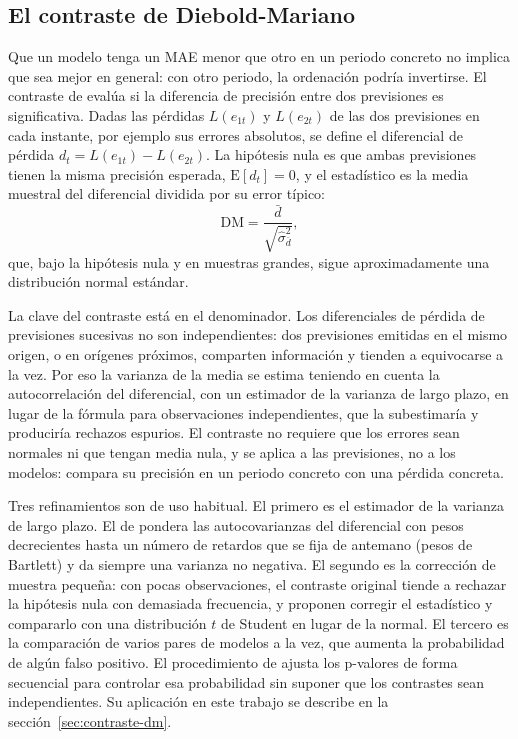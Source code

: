 \subsection{El contraste de Diebold-Mariano}\label{sec:diebold-mariano}

Que un modelo tenga un MAE menor que otro en un periodo concreto no implica
que sea mejor en general: con otro periodo, la ordenación podría invertirse.
El contraste de \textcite{diebold1995comparing} evalúa si la diferencia de
precisión entre dos previsiones es significativa. Dadas las pérdidas
$L(e_{1t})$ y $L(e_{2t})$ de las dos previsiones en cada instante, por
ejemplo sus errores absolutos, se define el diferencial de pérdida
$d_t = L(e_{1t}) - L(e_{2t})$. La hipótesis nula es que ambas previsiones
tienen la misma precisión esperada, $\mathrm{E}[d_t] = 0$, y el estadístico
es la media muestral del diferencial dividida por su error típico:
\begin{equation}
	\mathrm{DM} = \frac{\bar{d}}{\sqrt{\hat{\sigma}^2_{\bar{d}}}},
\end{equation}
que, bajo la hipótesis nula y en muestras grandes, sigue aproximadamente una
distribución normal estándar.

La clave del contraste está en el denominador. Los diferenciales de
pérdida de previsiones sucesivas no son independientes: dos previsiones
emitidas en el mismo origen, o en orígenes próximos, comparten información y
tienden a equivocarse a la vez. Por eso la varianza de la media se estima
teniendo en cuenta la autocorrelación del diferencial, con un estimador de
la varianza de largo plazo, en lugar de la fórmula para observaciones
independientes, que la subestimaría y produciría rechazos espurios. El
contraste no requiere que los errores sean normales ni que tengan media
nula, y se aplica a las previsiones, no a los modelos: compara su precisión
en un periodo concreto con una pérdida concreta.

Tres refinamientos son de uso habitual. El primero es el estimador de la
varianza de largo plazo. El de \textcite{newey1987simple} pondera las
autocovarianzas del diferencial con pesos decrecientes hasta un número de
retardos que se fija de antemano (pesos de Bartlett) y da siempre una varianza
no negativa. El segundo es la corrección de muestra pequeña: con pocas
observaciones, el contraste original tiende a rechazar la hipótesis nula con
demasiada frecuencia, y \textcite{harvey1997testing} proponen corregir el
estadístico y compararlo con una distribución $t$ de Student en lugar de la
normal. El tercero es la comparación de varios pares de modelos a la vez, que
aumenta la probabilidad de algún falso positivo. El procedimiento de
\textcite{holm1979simple} ajusta los p-valores de forma secuencial para
controlar esa probabilidad sin suponer que los contrastes sean independientes.
Su aplicación en este trabajo se describe en la
sección~\ref{sec:contraste-dm}.

